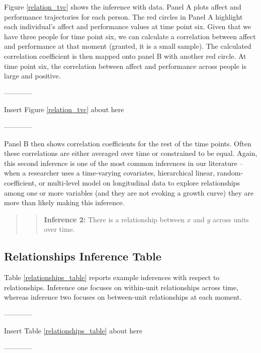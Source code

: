 \documentclass[english,,man]{apa6}
\theoremstyle{definition}
\theoremstyle{definition}
\theoremstyle{definition}
\theoremstyle{remark}
\begin{document}
Figure \ref{relation_tvc} shows the inference with data. Panel A plots
affect and performance trajectories for each person. The red circles in
Panel A highlight each individual's affect and performance values at
time point six. Given that we have three people for time point six, we
can calculate a correlation between affect and performance at that
moment (granted, it is a small sample). The calculated correlation
coefficient is then mapped onto panel B with another red circle. At time
point six, the correlation between affect and performance across people
is large and positive.

\begin{center}

------------

Insert Figure \ref{relation_tvc} about here

------------

\end{center}

Panel B then shows correlation coefficients for the rest of the time
points. Often these correlations are either averaged over time or
constrained to be equal. Again, this second inference is one of the most
common inferences in our literature -- when a researcher uses a
time-varying covariates, hierarchical linear, random-coefficient, or
multi-level model on longitudinal data to explore relationships among
one or more variables (and they are not evoking a growth curve) they are
more than likely making this inference.

\begin{quote}
\begin{quote}
\textbf{Inference 2:} There is a relationship between \(x\) and \(y\)
across units over time.
\end{quote}
\end{quote}

\hypertarget{relationships-inference-table}{%
\subsection{Relationships Inference
Table}\label{relationships-inference-table}}

Table \ref{relationships_table} reports example inferences with respect
to relationships. Inference one focuses on within-unit relationships
across time, whereas inference two focuses on between-unit relationships
at each moment.

\begin{center}

------------

Insert Table \ref{relationships_table} about here

------------

\end{center}
\end{document}
